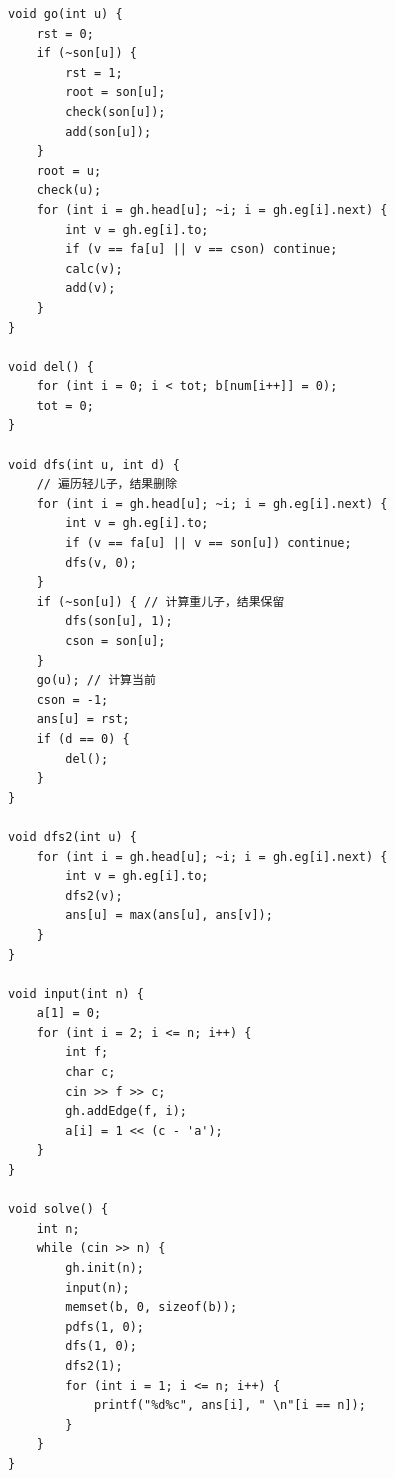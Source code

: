 \documentclass[twoside]{article}
\begin{document}
\begin{lstlisting}
void go(int u) {
    rst = 0;
    if (~son[u]) {
        rst = 1;
        root = son[u];
        check(son[u]);
        add(son[u]);
    }
    root = u;
    check(u);
    for (int i = gh.head[u]; ~i; i = gh.eg[i].next) {
        int v = gh.eg[i].to;
        if (v == fa[u] || v == cson) continue;
        calc(v);
        add(v);
    }
}

void del() {
    for (int i = 0; i < tot; b[num[i++]] = 0);
    tot = 0;
}

void dfs(int u, int d) {
    // 遍历轻儿子，结果删除
    for (int i = gh.head[u]; ~i; i = gh.eg[i].next) {
        int v = gh.eg[i].to;
        if (v == fa[u] || v == son[u]) continue;
        dfs(v, 0);
    }
    if (~son[u]) { // 计算重儿子，结果保留
        dfs(son[u], 1);
        cson = son[u];
    }
    go(u); // 计算当前
    cson = -1;
    ans[u] = rst;
    if (d == 0) {
        del();
    }
}

void dfs2(int u) {
    for (int i = gh.head[u]; ~i; i = gh.eg[i].next) {
        int v = gh.eg[i].to;
        dfs2(v);
        ans[u] = max(ans[u], ans[v]);
    }
}

void input(int n) {
    a[1] = 0;
    for (int i = 2; i <= n; i++) {
        int f;
        char c;
        cin >> f >> c;
        gh.addEdge(f, i);
        a[i] = 1 << (c - 'a');
    }
}

void solve() {
    int n;
    while (cin >> n) {
        gh.init(n);
        input(n);
        memset(b, 0, sizeof(b));
        pdfs(1, 0);
        dfs(1, 0);
        dfs2(1);
        for (int i = 1; i <= n; i++) {
            printf("%d%c", ans[i], " \n"[i == n]);
        }
    }
}\end{lstlisting}
\end{document}
